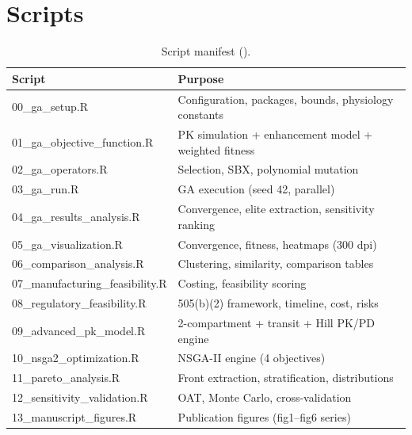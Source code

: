 \section{Scripts}
\begin{table}[htbp]
\centering
\caption{Script manifest ().}
\label{tab:trace-scripts}
\small
\begin{tabular}{lp{9.6cm}}
\toprule
Script & Purpose\\
\midrule
00\_ga\_setup.R & Configuration, packages, bounds, physiology constants\\
01\_ga\_objective\_function.R & PK simulation + enhancement model + weighted fitness\\
02\_ga\_operators.R & Selection, SBX, polynomial mutation\\
03\_ga\_run.R & GA execution (seed 42, parallel)\\
04\_ga\_results\_analysis.R & Convergence, elite extraction, sensitivity ranking\\
05\_ga\_visualization.R & Convergence, fitness, heatmaps (300 dpi)\\
06\_comparison\_analysis.R & Clustering, similarity, comparison tables\\
07\_manufacturing\_feasibility.R & Costing, feasibility scoring\\
08\_regulatory\_feasibility.R & 505(b)(2) framework, timeline, cost, risks\\
09\_advanced\_pk\_model.R & 2-compartment + transit + Hill PK/PD engine\\
10\_nsga2\_optimization.R & NSGA-II engine (4 objectives)\\
11\_pareto\_analysis.R & Front extraction, stratification, distributions\\
12\_sensitivity\_validation.R & OAT, Monte Carlo, cross-validation\\
13\_manuscript\_figures.R & Publication figures (fig1--fig6 series)\\
\bottomrule
\end{tabular}
\end{table}
